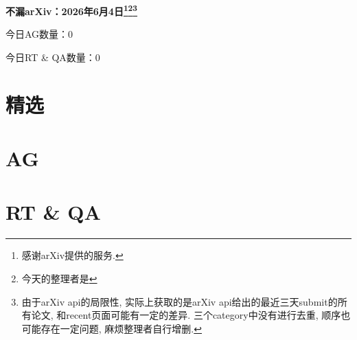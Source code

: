 \documentclass[9pt, a4paper]{article}
\theoremstyle{plain}
\theoremstyle{definition}
\theoremstyle{remark}
\newcommand{\AGnumber}{0}
\newcommand{\RTQAnumber}{0}
\newcommand{\NewestDate}{2026年6月4日}
\newcommand{\todayarXiver}{} %
\begin{document}
\begin{center}
    \Huge\textbf{不漏arXiv：\NewestDate\footnote{感谢arXiv提供的服务.}\footnote{今天的整理者是\todayarXiver}\footnote{由于arXiv api的局限性, 实际上获取的是arXiv api给出的最近三天submit的所有论文, 和recent页面可能有一定的差异. 三个category中没有进行去重, 顺序也可能存在一定问题, 麻烦整理者自行增删.}} \\
\end{center}

\setcounter{section}{-1}

\begin{center}
    今日AG数量：\AGnumber
    
    今日RT \& QA数量：\RTQAnumber
    
\end{center}


\section{精选}


\section{AG}

\section{RT \& QA}
\end{document}

